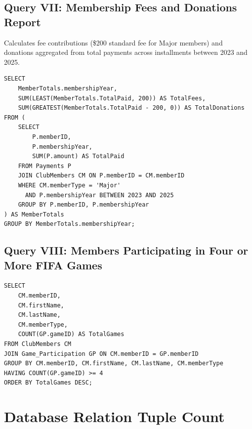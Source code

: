 \documentclass[11pt,a4paper]{article}
\begin{document}
\subsection{Query VII: Membership Fees and Donations Report}

Calculates fee contributions (\$200 standard fee for Major members) and donations aggregated from total payments across installments between 2023 and 2025.

\begin{verbatim}
SELECT 
    MemberTotals.membershipYear,
    SUM(LEAST(MemberTotals.TotalPaid, 200)) AS TotalFees,
    SUM(GREATEST(MemberTotals.TotalPaid - 200, 0)) AS TotalDonations
FROM (
    SELECT 
        P.memberID,
        P.membershipYear,
        SUM(P.amount) AS TotalPaid
    FROM Payments P
    JOIN ClubMembers CM ON P.memberID = CM.memberID
    WHERE CM.memberType = 'Major' 
      AND P.membershipYear BETWEEN 2023 AND 2025
    GROUP BY P.memberID, P.membershipYear
) AS MemberTotals
GROUP BY MemberTotals.membershipYear;
\end{verbatim}


\subsection{Query VIII: Members Participating in Four or More FIFA Games}

\begin{verbatim}
SELECT 
    CM.memberID,
    CM.firstName,
    CM.lastName,
    CM.memberType,
    COUNT(GP.gameID) AS TotalGames
FROM ClubMembers CM
JOIN Game_Participation GP ON CM.memberID = GP.memberID
GROUP BY CM.memberID, CM.firstName, CM.lastName, CM.memberType
HAVING COUNT(GP.gameID) >= 4
ORDER BY TotalGames DESC;
\end{verbatim}





\section{Database Relation Tuple Count}
\end{document}
